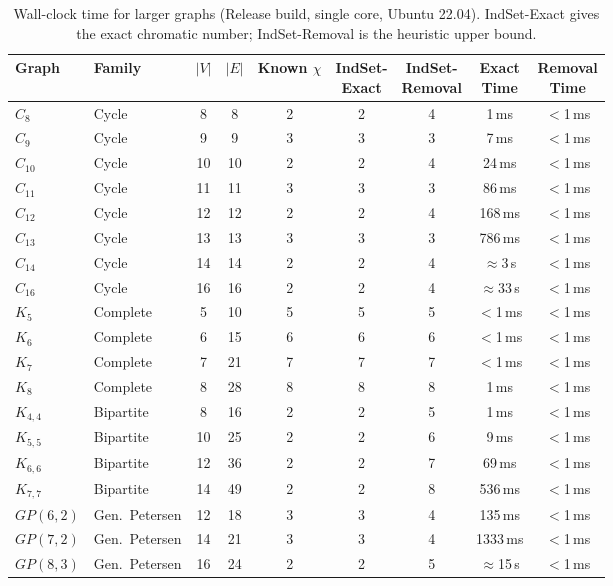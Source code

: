 \documentclass[11pt]{article}
\begin{document}
\begin{table}[h]
\centering
\caption{Wall-clock time for larger graphs (Release build, single core, Ubuntu 22.04).
  IndSet-Exact gives the exact chromatic number; IndSet-Removal is the heuristic upper bound.}
\label{tab:scaling}
\begin{tabular}{llccccccc}
\toprule
Graph & Family & $|V|$ & $|E|$ & \makecell{Known\\$\chi$} & \makecell{IndSet-\\Exact} & \makecell{IndSet-\\Removal} & \makecell{Exact\\Time} & \makecell{Removal\\Time} \\
\midrule
$C_8$     & Cycle          &  8 &  8 & 2 & 2 & 4 &    1\,ms & $<$1\,ms \\
$C_9$     & Cycle          &  9 &  9 & 3 & 3 & 3 &    7\,ms & $<$1\,ms \\
$C_{10}$  & Cycle          & 10 & 10 & 2 & 2 & 4 &   24\,ms & $<$1\,ms \\
$C_{11}$  & Cycle          & 11 & 11 & 3 & 3 & 3 &   86\,ms & $<$1\,ms \\
$C_{12}$  & Cycle          & 12 & 12 & 2 & 2 & 4 &  168\,ms & $<$1\,ms \\
$C_{13}$  & Cycle          & 13 & 13 & 3 & 3 & 3 &  786\,ms & $<$1\,ms \\
$C_{14}$  & Cycle          & 14 & 14 & 2 & 2 & 4 & $\approx$3\,s & $<$1\,ms \\
$C_{16}$  & Cycle          & 16 & 16 & 2 & 2 & 4 & $\approx$33\,s & $<$1\,ms \\
\midrule
$K_5$     & Complete       &  5 & 10 & 5 & 5 & 5 & $<$1\,ms & $<$1\,ms \\
$K_6$     & Complete       &  6 & 15 & 6 & 6 & 6 & $<$1\,ms & $<$1\,ms \\
$K_7$     & Complete       &  7 & 21 & 7 & 7 & 7 & $<$1\,ms & $<$1\,ms \\
$K_8$     & Complete       &  8 & 28 & 8 & 8 & 8 &    1\,ms & $<$1\,ms \\
\midrule
$K_{4,4}$ & Bipartite      &  8 & 16 & 2 & 2 & 5 &    1\,ms & $<$1\,ms \\
$K_{5,5}$ & Bipartite      & 10 & 25 & 2 & 2 & 6 &    9\,ms & $<$1\,ms \\
$K_{6,6}$ & Bipartite      & 12 & 36 & 2 & 2 & 7 &   69\,ms & $<$1\,ms \\
$K_{7,7}$ & Bipartite      & 14 & 49 & 2 & 2 & 8 &  536\,ms & $<$1\,ms \\
\midrule
$GP(6,2)$ & Gen.\ Petersen & 12 & 18 & 3 & 3 & 4 &  135\,ms & $<$1\,ms \\
$GP(7,2)$ & Gen.\ Petersen & 14 & 21 & 3 & 3 & 4 & 1333\,ms & $<$1\,ms \\
$GP(8,3)$ & Gen.\ Petersen & 16 & 24 & 2 & 2 & 5 & $\approx$15\,s & $<$1\,ms \\
\bottomrule
\end{tabular}
\end{table}
\end{document}
